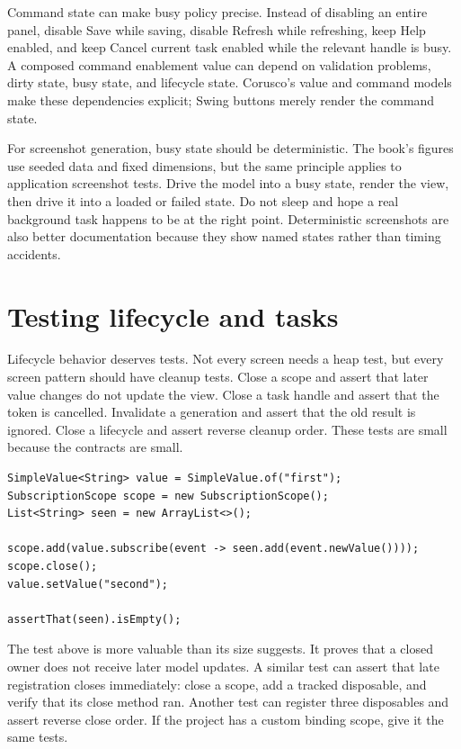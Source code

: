 Command state can make busy policy precise. Instead of disabling an entire
panel, disable Save while saving, disable Refresh while refreshing, keep Help
enabled, and keep Cancel current task enabled while the relevant handle is
busy. A composed command enablement value can depend on validation problems,
dirty state, busy state, and lifecycle state. Corusco's value and command
models make these dependencies explicit; Swing buttons merely render the
command state.

For screenshot generation, busy state should be deterministic. The book's
figures use seeded data and fixed dimensions, but the same principle applies
to application screenshot tests. Drive the model into a busy state, render the
view, then drive it into a loaded or failed state. Do not sleep and hope a real
background task happens to be at the right point. Deterministic screenshots are
also better documentation because they show named states rather than timing
accidents.

\section{Testing lifecycle and tasks}

Lifecycle behavior deserves tests. Not every screen needs a heap test, but
every screen pattern should have cleanup tests. Close a scope and assert that
later value changes do not update the view. Close a task handle and assert that
the token is cancelled. Invalidate a generation and assert that the old result
is ignored. Close a lifecycle and assert reverse cleanup order. These tests are
small because the contracts are small.

\begin{lstlisting}[caption={Testing a closed subscription scope.}]
SimpleValue<String> value = SimpleValue.of("first");
SubscriptionScope scope = new SubscriptionScope();
List<String> seen = new ArrayList<>();

scope.add(value.subscribe(event -> seen.add(event.newValue())));
scope.close();
value.setValue("second");

assertThat(seen).isEmpty();
\end{lstlisting}

The test above is more valuable than its size suggests. It proves that a
closed owner does not receive later model updates. A similar test can assert
that late registration closes immediately: close a scope, add a tracked
disposable, and verify that its close method ran. Another test can register
three disposables and assert reverse close order. If the project has a custom
binding scope, give it the same tests.


